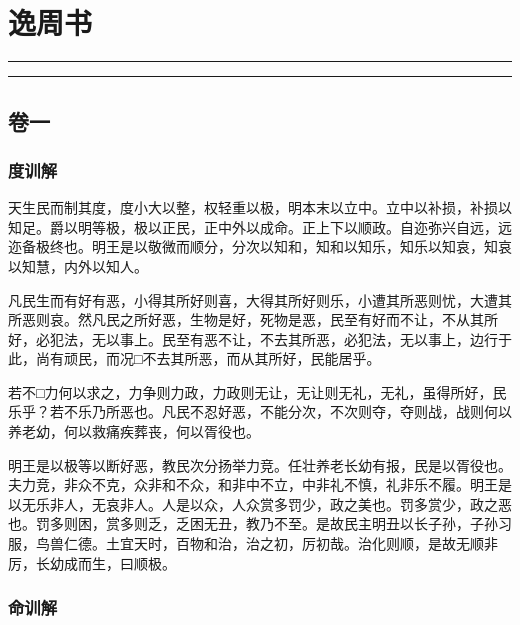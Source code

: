 \documentclass[]{article}
\date{}
\begin{document}
\hypertarget{header-n0}{%
\section{逸周书}\label{header-n0}}

\begin{center}\rule{0.5\linewidth}{\linethickness}\end{center}

\tableofcontents

\begin{center}\rule{0.5\linewidth}{\linethickness}\end{center}

\hypertarget{header-n6}{%
\subsection{卷一}\label{header-n6}}

\hypertarget{header-n7}{%
\subsubsection{度训解}\label{header-n7}}

天生民而制其度，度小大以整，权轻重以极，明本末以立中。立中以补损，补损以知足。爵以明等极，极以正民，正中外以成命。正上下以顺政。自迩弥兴自远，远迩备极终也。明王是以敬微而顺分，分次以知和，知和以知乐，知乐以知哀，知哀以知慧，内外以知人。

凡民生而有好有恶，小得其所好则喜，大得其所好则乐，小遭其所恶则忧，大遭其所恶则哀。然凡民之所好恶，生物是好，死物是恶，民至有好而不让，不从其所好，必犯法，无以事上。民至有恶不让，不去其所恶，必犯法，无以事上，边行于此，尚有顽民，而况□不去其所恶，而从其所好，民能居乎。

若不□力何以求之，力争则力政，力政则无让，无让则无礼，无礼，虽得所好，民乐乎？若不乐乃所恶也。凡民不忍好恶，不能分次，不次则夺，夺则战，战则何以养老幼，何以救痛疾葬丧，何以胥役也。

明王是以极等以断好恶，教民次分扬举力竞。任壮养老长幼有报，民是以胥役也。夫力竞，非众不克，众非和不众，和非中不立，中非礼不慎，礼非乐不履。明王是以无乐非人，无哀非人。人是以众，人众赏多罚少，政之美也。罚多赏少，政之恶也。罚多则困，赏多则乏，乏困无丑，教乃不至。是故民主明丑以长子孙，子孙习服，鸟兽仁德。土宜天时，百物和治，治之初，厉初哉。治化则顺，是故无顺非厉，长幼成而生，曰顺极。

\hypertarget{header-n14}{%
\subsubsection{命训解}\label{header-n14}}
\end{document}
